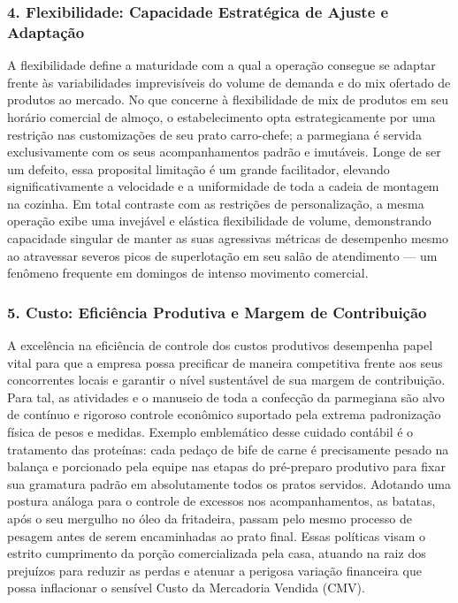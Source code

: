 \documentclass[12pt, a4paper]{article}
\begin{document}
\subsubsection*{4. Flexibilidade: Capacidade Estratégica de Ajuste e Adaptação}
A flexibilidade define a maturidade com a qual a operação consegue se adaptar frente às variabilidades imprevisíveis do volume de demanda e do mix ofertado de produtos ao mercado. No que concerne à flexibilidade de mix de produtos em seu horário comercial de almoço, o estabelecimento opta estrategicamente por uma restrição nas customizações de seu prato carro-chefe; a parmegiana é servida exclusivamente com os seus acompanhamentos padrão e imutáveis. Longe de ser um defeito, essa proposital limitação é um grande facilitador, elevando significativamente a velocidade e a uniformidade de toda a cadeia de montagem na cozinha. Em total contraste com as restrições de personalização, a mesma operação exibe uma invejável e elástica flexibilidade de volume, demonstrando capacidade singular de manter as suas agressivas métricas de desempenho mesmo ao atravessar severos picos de superlotação em seu salão de atendimento --- um fenômeno frequente em domingos de intenso movimento comercial.

\subsubsection*{5. Custo: Eficiência Produtiva e Margem de Contribuição}
A excelência na eficiência de controle dos custos produtivos desempenha papel vital para que a empresa possa precificar de maneira competitiva frente aos seus concorrentes locais e garantir o nível sustentável de sua margem de contribuição. Para tal, as atividades e o manuseio de toda a confecção da parmegiana são alvo de contínuo e rigoroso controle econômico suportado pela extrema padronização física de pesos e medidas. Exemplo emblemático desse cuidado contábil é o tratamento das proteínas: cada pedaço de bife de carne é precisamente pesado na balança e porcionado pela equipe nas etapas do pré-preparo produtivo para fixar sua gramatura padrão em absolutamente todos os pratos servidos. Adotando uma postura análoga para o controle de excessos nos acompanhamentos, as batatas, após o seu mergulho no óleo da fritadeira, passam pelo mesmo processo de pesagem antes de serem encaminhadas ao prato final. Essas políticas visam o estrito cumprimento da porção comercializada pela casa, atuando na raiz dos prejuízos para reduzir as perdas e atenuar a perigosa variação financeira que possa inflacionar o sensível Custo da Mercadoria Vendida (CMV).
\end{document}
